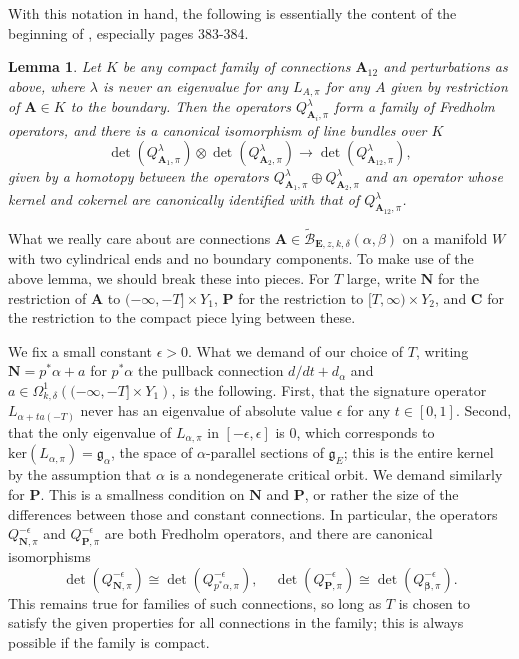 \documentclass[10pt,a4paper]{amsart}
\newtheorem{lemma}[theorem]{Lemma}
\theoremstyle{definition}
\theoremstyle{remark}
\numberwithin{figure}{qchap}
\begin{document}
With this notation in hand, the following is essentially the content of the beginning of \cite[Section~20.3]{KMSW}, especially pages 383-384.

\begin{lemma}\label{index-gluing}Let $K$ be any compact family of connections $\mathbf{A}_{12}$ and perturbations as above, where $\lambda$ is never an eigenvalue for any $L_{A,\pi}$ for any $A$ given by restriction of $\mathbf{A} \in K$ to the boundary. Then the operators $Q^\lambda_{\mathbf{A}_i,\pi}$ form a family of Fredholm operators, and there is a canonical isomorphism of line bundles over $K$
$$\det(Q^\lambda_{\mathbf{A}_1, \pi}) \otimes \det(Q^\lambda_{\mathbf{A}_2, \pi}) \to \det(Q^\lambda_{\mathbf{A}_{12},\pi}),$$ given by a homotopy between the operators $Q^\lambda_{\mathbf{A}_1, \pi} \oplus Q^\lambda_{\mathbf{A}_2, \pi}$ and an operator whose kernel and cokernel are canonically identified with that of $Q^\lambda_{\mathbf{A}_{12},\pi}$.
\end{lemma}

What we really care about are connections $\mathbf{A} \in \widetilde{\mathcal B}_{\mathbf{E},z,k,\delta}(\alpha, \beta)$ on a manifold $W$ with two cylindrical ends and no boundary components. To make use of the above lemma, we should break these into pieces. For $T$ large, write $\mathbf{N}$ for the restriction of $\mathbf{A}$ to $(-\infty, -T] \times Y_1$, $\mathbf{P}$ for the restriction to $[T, \infty) \times Y_2$, and $\mathbf{C}$ for the restriction to the compact piece lying between these.

We fix a small constant $\epsilon > 0$. What we demand of our choice of $T$, writing $\mathbf{N} = p^*\alpha + a$ for $p^*\alpha$ the pullback connection $d/dt + d_\alpha$ and $a \in \Omega^1_{k,\delta}\left( (-\infty, -T] \times Y_1\right)$, is the following. First, that the signature operator $L_{\alpha + t a(-T)}$ never has an eigenvalue of absolute value $\epsilon$ for any $t \in [0,1]$. Second, that the only eigenvalue of $L_{\alpha,\pi}$ in $[-\epsilon, \epsilon]$ is $0$, which corresponds to $\text{ker}(L_{\alpha, \pi}) = \mathfrak g_\alpha$, the space of $\alpha$-parallel sections of $\mathfrak g_E$; this is the entire kernel by the assumption that $\alpha$ is a nondegenerate critical orbit. We demand similarly for $\mathbf{P}$. This is a smallness condition on $\mathbf{N}$ and $\mathbf{P}$, or rather the size of the differences between those and constant connections. In particular, the operators $Q^{-\epsilon}_{\mathbf{N},\pi}$ and $Q^{-\epsilon}_{\mathbf{P},\pi}$ are both Fredholm operators, and there are canonical isomorphisms $$\det(Q_{\mathbf{N},\pi}^{-\epsilon}) \cong \det(Q_{p^*\alpha,\pi}^{-\epsilon}), \;\;\;\; \det(Q_{\mathbf{P},\pi}^{-\epsilon}) \cong \det(Q_{\mathbf{\beta},\pi}^{-\epsilon}).$$ This remains true for families of such connections, so long as $T$ is chosen to satisfy the given properties for all connections in the family; this is always possible if the family is compact.
\end{document}
